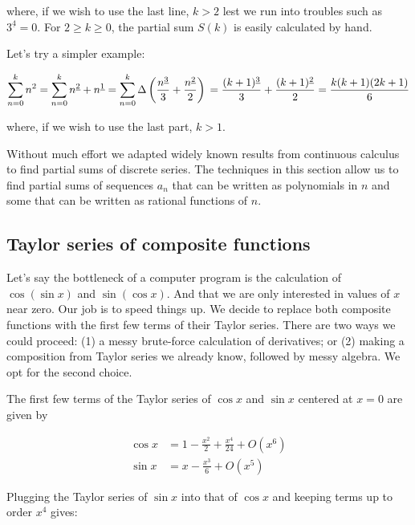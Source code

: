 \documentclass{article}
\begin{document}
\noindent where, if we wish to use the last line, $k > 2$ lest we run into
troubles such as $3^{\underline{4}}=0$. For $2 \geq k \geq 0$, the partial sum
$S(k)$ is easily calculated by hand.

Let's try a simpler example:

\[
    \sum\limits_{n=0}^k n^2 \\
    =\sum\limits_{n=0}^k n^{\underline{2}}+n^{\underline{1}} \\
    =\sum\limits_{n=0}^k \Delta \left(\frac{n^{\underline{3}}}{3}+\frac{n^{\underline{2}}}{2}\right) \\
    =\frac{(k+1)^{\underline{3}}}{3}+\frac{(k+1)^{\underline{2}}}{2} \\
    =\frac{k(k+1)(2k+1)}{6}
\]

\noindent where, if we wish to use the last part, $k > 1$.

Without much effort we adapted widely known results from continuous calculus to
find partial sums of discrete series. The techniques in this section allow us
to find partial sums of sequences $a_n$ that can be written as polynomials in
$n$ and some that can be written as rational functions of $n$.


\subsection*{Taylor series of composite functions}

Let's say the bottleneck of a computer program is the calculation of $\cos(\sin
x)$ and $\sin(\cos x)$. And that we are only interested  in values of $x$ near
zero. Our job is to speed things up. We decide to replace both composite
functions with the first few terms of their Taylor series. There are two ways
we could proceed: (1) a messy brute-force calculation of derivatives; or (2)
making a composition from Taylor series we already know, followed by messy
algebra. We opt for the second choice.

The first few terms of the Taylor series of $\cos x$ and $\sin x$ centered at
$x=0$ are given by

\begin{align*}
    \cos x &= 1 - \frac{x^2}{2} + \frac{x^4}{24} + O(x^6) \\
    \sin x &= x - \frac{x^3}{6} + O(x^5)
\end{align*}

\noindent Plugging the Taylor series of $\sin x$ into that of $\cos x$ and
keeping terms up to order $x^4$ gives:
\end{document}
